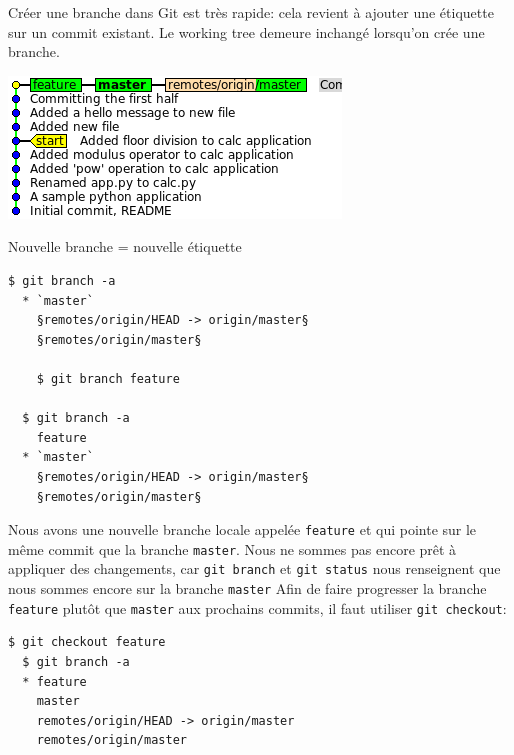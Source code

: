 \documentclass{../../common/tufte-latex/tufte-handout}
\begin{document}
Créer une branche dans Git est très rapide: cela revient à ajouter une étiquette sur un commit existant.
Le working tree demeure inchangé lorsqu'on crée une branche.
\begin{marginfigure}%
  \centering
  \includegraphics[width=\linewidth]{gitbranch-feature.png}
  \label{fig:gitbranch-feature}
  \caption{Nouvelle branche = nouvelle étiquette}
\end{marginfigure}
\begin{lstlisting}[style=BashInputStyle]
  $ git branch -a
  * `master`
    §remotes/origin/HEAD -> origin/master§
    §remotes/origin/master§

    $ git branch feature

  $ git branch -a
    feature
  * `master`
    §remotes/origin/HEAD -> origin/master§
    §remotes/origin/master§
\end{lstlisting}

Nous avons une nouvelle branche locale appelée \texttt{feature} et qui pointe sur le même commit que la branche \texttt{master}.
Nous ne sommes pas encore prêt à appliquer des changements, car \texttt{git branch} et \texttt{git status} nous renseignent que nous sommes encore sur la branche \texttt{master}
Afin de faire progresser la branche \texttt{feature} plutôt que \texttt{master} aux prochains commits, il faut utiliser \texttt{git checkout}:

\begin{lstlisting}[style=BashInputStyle]
  $ git checkout feature
  $ git branch -a
  * feature
    master
    remotes/origin/HEAD -> origin/master
    remotes/origin/master
\end{lstlisting}
\end{document}
